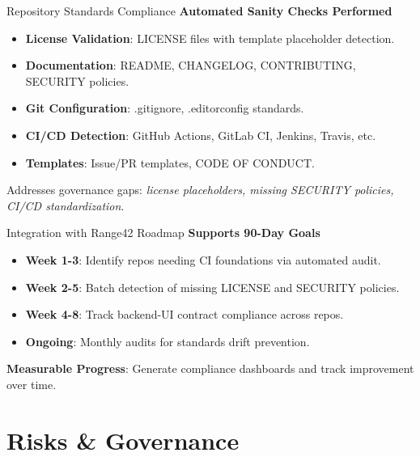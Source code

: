 \documentclass[aspectratio=169]{beamer}
\begin{document}
\begin{frame}{Repository Standards Compliance}
  \faClipboardCheck\;
  \textbf{Automated Sanity Checks Performed}
  \begin{itemize}
    \item \textbf{License Validation}: LICENSE files with template placeholder detection.
    \item \textbf{Documentation}: README, CHANGELOG, CONTRIBUTING, SECURITY policies.
    \item \textbf{Git Configuration}: .gitignore, .editorconfig standards.
    \item \textbf{CI/CD Detection}: GitHub Actions, GitLab CI, Jenkins, Travis, etc.
    \item \textbf{Templates}: Issue/PR templates, CODE OF CONDUCT.
  \end{itemize}
  \begin{tcolorbox}
    \faInfoCircle\; Addresses governance gaps: \emph{license placeholders, missing SECURITY policies, CI/CD standardization}.
  \end{tcolorbox}
\end{frame}

\begin{frame}{Integration with Range42 Roadmap}
  \faRocket\;
  \textbf{Supports 90-Day Goals}
  \begin{itemize}
    \item \textbf{Week 1-3}: Identify repos needing CI foundations via automated audit.
    \item \textbf{Week 2-5}: Batch detection of missing LICENSE and SECURITY policies.
    \item \textbf{Week 4-8}: Track backend-UI contract compliance across repos.
    \item \textbf{Ongoing}: Monthly audits for standards drift prevention.
  \end{itemize}
  \begin{tcolorbox}
    \faLightbulb\; \textbf{Measurable Progress}: Generate compliance dashboards and track improvement over time.
  \end{tcolorbox}
\end{frame}

\section{Risks \& Governance}
\end{document}
